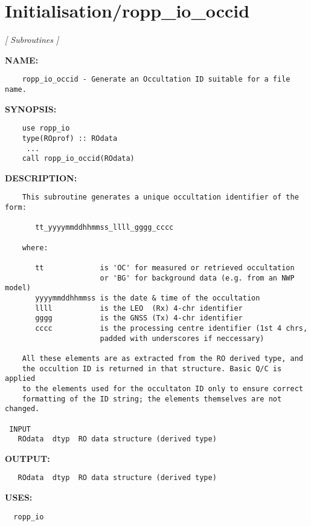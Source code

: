 \section{Initialisation/ropp\_io\_occid}
\textsl{[ Subroutines ]}

\label{ch:robo70}
\label{ch:Initialisation_ropp_io_occid}
\textbf{NAME:}\hspace{0.08in}\begin{Verbatim}
    ropp_io_occid - Generate an Occultation ID suitable for a file name.
\end{Verbatim}
\textbf{SYNOPSIS:}\hspace{0.08in}\begin{Verbatim}
    use ropp_io
    type(ROprof) :: ROdata
     ...
    call ropp_io_occid(ROdata)
\end{Verbatim}
\textbf{DESCRIPTION:}\hspace{0.08in}\begin{Verbatim}
    This subroutine generates a unique occultation identifier of the form:

       tt_yyyymmddhhmmss_llll_gggg_cccc

    where:

       tt             is 'OC' for measured or retrieved occultation
                      or 'BG' for background data (e.g. from an NWP model)
       yyyymmddhhmmss is the date & time of the occultation
       llll           is the LEO  (Rx) 4-chr identifier
       gggg           is the GNSS (Tx) 4-chr identifier
       cccc           is the processing centre identifier (1st 4 chrs,
                      padded with underscores if neccessary)

    All these elements are as extracted from the RO derived type, and
    the occultion ID is returned in that structure. Basic Q/C is applied
    to the elements used for the occultaton ID only to ensure correct
    formatting of the ID string; the elements themselves are not changed.

 INPUT
   ROdata  dtyp  RO data structure (derived type)
\end{Verbatim}
\textbf{OUTPUT:}\hspace{0.08in}\begin{Verbatim}
   ROdata  dtyp  RO data structure (derived type)
\end{Verbatim}
\textbf{USES:}\hspace{0.08in}\begin{Verbatim}
  ropp_io
\end{Verbatim}
